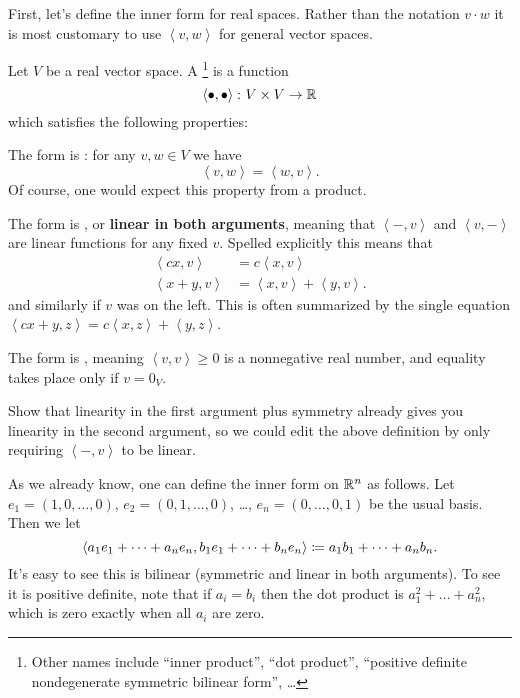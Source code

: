 First, let's define the inner form for real spaces.
Rather than the notation $v \cdot w$ it is most customary
to use $\left< v,w \right>$ for general vector spaces.
\begin{definition}
	Let $V$ be a real vector space.
	A \footnote{Other
		names include ``inner product'', ``dot product'',
		``positive definite nondegenerate symmetric bilinear form'', \dots}
	is a function
	\[ \left< \bullet, \bullet \right> \colon V \times V \to \mathbb R \]
	which satisfies the following properties:
	\begin{itemize}
		\ii The form is : for any $v,w \in V$ we have
		\[ \left< v,w \right> = \left< w,v\right>. \]
		Of course, one would expect this property from a product.

		\ii The form is , or \textbf{linear in both arguments},
		meaning that $\left< -, v\right>$
		and $\left< v, -\right>$ are linear functions for any fixed $v$.
		Spelled explicitly this means that
		\begin{align*}
			\left< cx, v \right> &= c \left< x,v \right> \\
			\left< x+y, v \right> &= \left< x,v \right> + \left< y,v \right>.
		\end{align*}
		and similarly if $v$ was on the left.
		This is often summarized by the single equation
		$\left< cx+y, z \right> = c \left< x,z \right> + \left< y,z \right>$.

		\ii The form is , meaning $\left<v,v\right> \ge 0$
		is a nonnegative real number, and equality takes place only if $v = 0_V$.
	\end{itemize}
\end{definition}
\begin{exercise}
	Show that linearity in the first argument plus symmetry
	already gives you linearity in the second argument,
	so we could edit the above definition
	by only requiring $\left< -, v\right>$ to be linear.
\end{exercise}

\begin{example}
	[$\RR^n$]
	As we already know, one can define the inner form on $\RR^n$ as follows.
	Let $e_1 = (1, 0, \dots, 0)$, $e_2 = (0, 1, \dots, 0)$,
	\dots, $e_n = (0, \dots, 0, 1)$ be the usual basis.
	Then we let
	\[
		\left< a_1 e_1 + \dots + a_n e_n, b_1 e_1 + \dots + b_n e_n \right>
		\coloneqq a_1 b_1 + \dots + a_n b_n.
	\]
	It's easy to see this is bilinear
	(symmetric and linear in both arguments).
	To see it is positive definite,
	note that if $a_i = b_i$
	then the dot product is $a_1^2 + \dots + a_n^2$,
	which is zero exactly when all $a_i$ are zero.
\end{example}

